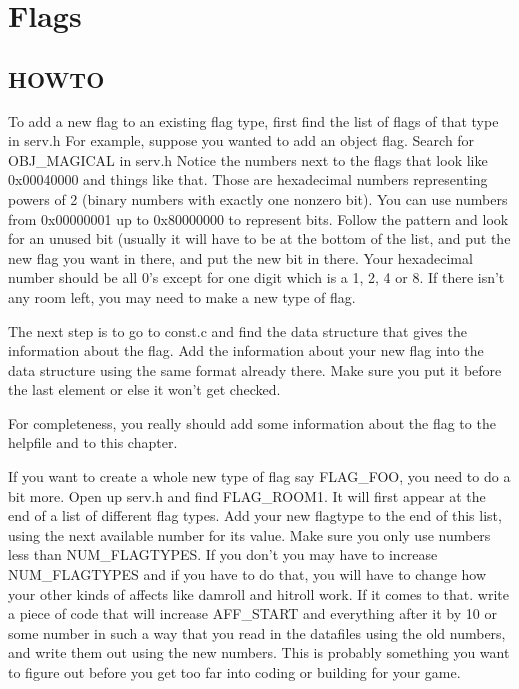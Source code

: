 \chapter{Flags}

\section{HOWTO}

To add a new flag to an existing flag type, first find the list of flags
of that type in serv.h For example, suppose you wanted to add an object 
flag. Search for OBJ\_MAGICAL in serv.h Notice the numbers next to the
flags that look like 0x00040000 and things like that. Those are 
hexadecimal numbers representing powers of 2 (binary numbers with
exactly one nonzero bit). You can use numbers from 0x00000001 up to
0x80000000 to represent bits. Follow the pattern and look for an
unused bit (usually it will have to be at the bottom of the list,
and put the new flag you want in there, and put the new bit in there.
Your hexadecimal number should be all 0's except for one digit which
is a 1, 2, 4 or 8. If there isn't any room left, you may need
to make a new type of flag. 

The next step is to go to const.c and find the data structure that
gives the information about the flag. Add the information about
your new flag into the data structure using the same format already
there. Make sure you put it before the last element or else it won't
get checked. 

For completeness, you really should add some information about the flag
to the helpfile and to this chapter.


If you want to create a whole new type of flag say FLAG\_FOO, you need
to do a bit more. Open up serv.h and find FLAG\_ROOM1. It will first
appear at the end of a list of different flag types. Add your new
flagtype to the end of this list, using the next available number for
its value. Make sure you only use numbers less than NUM\_FLAGTYPES.
If you don't you may have to increase NUM\_FLAGTYPES and if you have
to do that, you will have to change how your other kinds of affects
like damroll and hitroll work. If it comes to that. write a piece of
code that will increase AFF\_START and everything after it by 10 or
some number in such a way that you read in the datafiles using the old
numbers, and write them out using the new numbers. This is probably
something you want to figure out before you get too far into coding or
building for your game.

